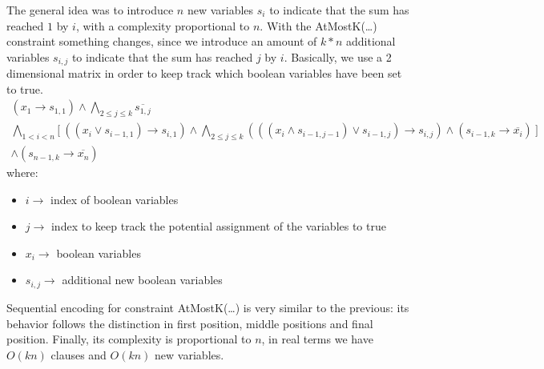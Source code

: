 The general idea was to introduce $n$ new variables $s_i$ to indicate that the sum has reached $1$ by $i$, with a complexity proportional to $n$. With
the AtMostK(\dots) constraint something changes, since we introduce an amount of $k * n$ additional variables $s_{i,j}$ to indicate that the sum has
reached $j$ by $i$. Basically, we use a 2 dimensional matrix in order to keep track which boolean variables have been set to true.
\[
    \begin{gathered}
        (x_1 \to s_{1,1}) \land \bigwedge_{2 \le j \le k} \overline{s_{1,j}} \\ 
        \bigwedge_{1 < i < n} \bigl[ \ ((x_i \lor s_{i-1,1}) \to s_{i,1}) \land \bigwedge_{2 \le j \le k} (((x_i \land s_{i-1,j-1}) \lor s_{i-1,j}) \to s_{i,j}) \land (s_{i-1,k} \to \overline{x_i}) \ \bigr]  \\ 
        \land (s_{n-1,k} \to \overline{x_n})
    \end{gathered}
\]
where:
\begin{itemize}
    \renewcommand{\labelitemi}{-}
    \item $i \rightarrow$ index of boolean variables
    \item $j \rightarrow$ index to keep track the potential assignment of the variables to true
    \item $x_i \rightarrow$ boolean variables
    \item $s_{i,j} \rightarrow$ additional new boolean variables
\end{itemize}
Sequential encoding for constraint AtMostK(\dots) is very similar to the previous: its behavior follows the distinction in first position, middle positions and 
final position. Finally, its complexity is proportional to $n$, in real terms we have $O(kn)$ clauses and $O(kn)$ new variables.